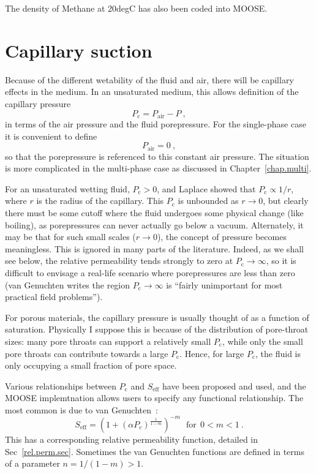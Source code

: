 \documentclass[]{scrreprt}
\begin{document}
The density of Methane at 20degC has also been coded into MOOSE.

\section{Capillary suction}

Because of the different wetability of the fluid and air, there will
be capillary effects in the medium.  In an unsaturated medium, this
allows definition of the capillary pressure
\begin{equation}
P_{\mathrm{c}} = P_{\mathrm{air}} - P \ ,
\end{equation}
in terms of the air pressure and the fluid porepressure.  For the
single-phase case it is convenient to define
\begin{equation}
P_{\mathrm{air}} = 0 \ ,
\label{eqn.pair.zero}
\end{equation}
so that the porepressure is referenced to this constant air pressure.
The situation is more complicated in the multi-phase case as discussed
in Chapter~\ref{chap.multi}.

For an unsaturated wetting fluid, $P_{\mathrm{c}} > 0$, and
Laplace showed that $P_{\mathrm{c}} \propto 1/r$, where $r$ is the
radius of the capillary.  This $P_{\mathrm{c}}$ is unbounded as
$r\rightarrow 0$, but clearly there must be some cutoff where the
fluid undergoes some physical change (like boiling), as porepressures
can never actually go below a vacuum.  Alternately, it may be that for
such small scales ($r\rightarrow 0$), the concept of pressure becomes
meaningless.  This is ignored in many parts of the literature.
Indeed, as we shall see below, the relative permeability tends
strongly to zero at $P_{\mathrm{c}} \rightarrow \infty$, so it is
difficult to envisage a real-life scenario where porepressures are
less than zero (van Genuchten writes the region
$P_{\mathrm{c}} \rightarrow \infty$ is ``fairly unimportant for most
practical field problems'').

For porous materials, the capillary pressure is usually thought of as
a function of saturation.  Physically I suppose this is because of the
distribution of pore-throat sizes: many pore throats can support a
relatively small $P_{\mathrm{c}}$, while only the small pore throats
can contribute towards a large $P_{\mathrm{c}}$.  Hence, for large
$P_{\mathrm{c}}$, the fluid is only occupying a small fraction of pore
space.

Various relationships between $P_{\mathrm{c}}$ and $S_{\mathrm{eff}}$
have been proposed and used, and the MOOSE implemtnation allows users
to specify any functional relationship.  The most common is due to van
Genuchten~\cite{vangenucthen1980}:
\begin{equation}
S_{\mathrm{eff}} = \left( 1 + (\alpha P_{c})^{\frac{1}{1 - m}}
\right)^{-m} \ \ \ \mbox{for}\ \ 0<m<1 \ .
\label{vg.cap.eqn}
\end{equation}
This has a corresponding relative permeability function, detailed in
Sec~\ref{rel.perm.sec}.  Sometimes the van Genuchten functions are
defined in terms of a parameter $n=1/(1-m)> 1$.
\end{document}
